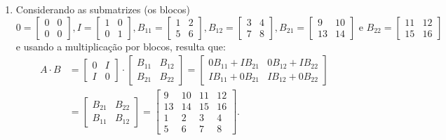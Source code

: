 \documentclass[12pt,a4paper]{article}
\begin{document}
\begin{enumerate}
\begin{enumerate}
\item Considerando as submatrizes (os blocos)
{\footnotesize
\[
0 = \begin{bmatrix}
0 & 0 \\
0 & 0
\end{bmatrix},
I = \begin{bmatrix}
1 & 0 \\
0 & 1
\end{bmatrix},
B_{11} = \begin{bmatrix}
1 & 2 \\
5 & 6
\end{bmatrix},
B_{12} = \begin{bmatrix}
3 & 4 \\
7 & 8
\end{bmatrix}, 
B_{21} = \begin{bmatrix}
9 & 10 \\
13 & 14
\end{bmatrix} \text{ e }
B_{22} = \begin{bmatrix}
11 & 12 \\
15 & 16
\end{bmatrix}
\]
}
e usando a multiplicação por blocos, resulta que:
\begin{align*}
A \cdot B
& =
\begin{bmatrix}
0
&
I \\
I
&
0
\end{bmatrix}
\cdot
\begin{bmatrix}
B_{11} & B_{12}\\
B_{21} & B_{22}
\end{bmatrix}
=
\begin{bmatrix}
  0 B_{11} + I B_{21}
& 0 B_{12} + I B_{22}\\
  I B_{11} + 0 B_{21}
& I B_{12} + 0 B_{22}
\end{bmatrix} \\
& =
\begin{bmatrix}
  B_{21} & B_{22}\\
  B_{11} & B_{12}
\end{bmatrix}
= 
\begin{bmatrix}
 9 & 10 & 11 & 12 \\
13 & 14 & 15 & 16 \\
 1 & 2 & 3 & 4 \\
 5 & 6 & 7 & 8
\end{bmatrix}.
\end{align*}
\end{enumerate}


\end{enumerate}
\end{document}
